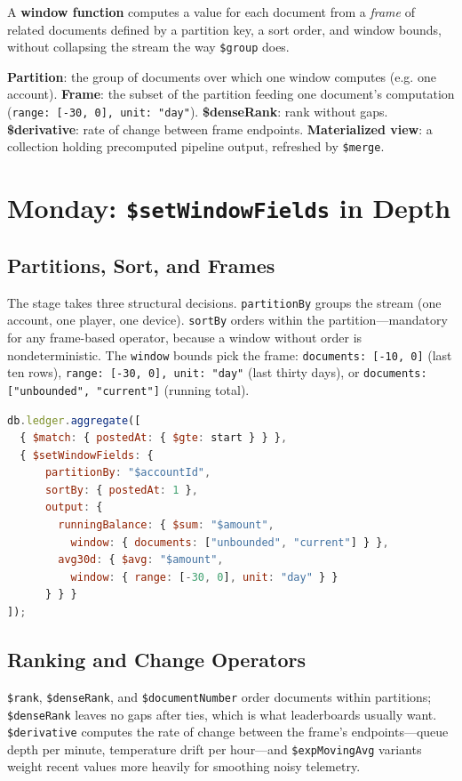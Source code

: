\begin{definitionbox}
A \textbf{window function} computes a value for each document from a \emph{frame} of related documents defined by a partition key, a sort order, and window bounds, without collapsing the stream the way \texttt{\$group} does.
\end{definitionbox}

\begin{keyterms}
\textbf{Partition}: the group of documents over which one window computes (e.g. one account). \textbf{Frame}: the subset of the partition feeding one document's computation (\texttt{range: [-30, 0], unit: "day"}). \textbf{\$denseRank}: rank without gaps. \textbf{\$derivative}: rate of change between frame endpoints. \textbf{Materialized view}: a collection holding precomputed pipeline output, refreshed by \texttt{\$merge}.
\end{keyterms}

\section{Monday: \texttt{\$setWindowFields} in Depth}
\subsection{Partitions, Sort, and Frames}
The stage takes three structural decisions. \texttt{partitionBy} groups the stream (one account, one player, one device). \texttt{sortBy} orders within the partition---mandatory for any frame-based operator, because a window without order is nondeterministic. The \texttt{window} bounds pick the frame: \texttt{documents: [-10, 0]} (last ten rows), \texttt{range: [-30, 0], unit: "day"} (last thirty days), or \texttt{documents: ["unbounded", "current"]} (running total).

\begin{lstlisting}[language=JavaScript, caption={Running balance and 30-day moving average per account.}]
db.ledger.aggregate([
  { $match: { postedAt: { $gte: start } } },
  { $setWindowFields: {
      partitionBy: "$accountId",
      sortBy: { postedAt: 1 },
      output: {
        runningBalance: { $sum: "$amount",
          window: { documents: ["unbounded", "current"] } },
        avg30d: { $avg: "$amount",
          window: { range: [-30, 0], unit: "day" } }
      } } }
]);
\end{lstlisting}

\subsection{Ranking and Change Operators}
\texttt{\$rank}, \texttt{\$denseRank}, and \texttt{\$documentNumber} order documents within partitions; \texttt{\$denseRank} leaves no gaps after ties, which is what leaderboards usually want. \texttt{\$derivative} computes the rate of change between the frame's endpoints---queue depth per minute, temperature drift per hour---and \texttt{\$expMovingAvg} variants weight recent values more heavily for smoothing noisy telemetry.

